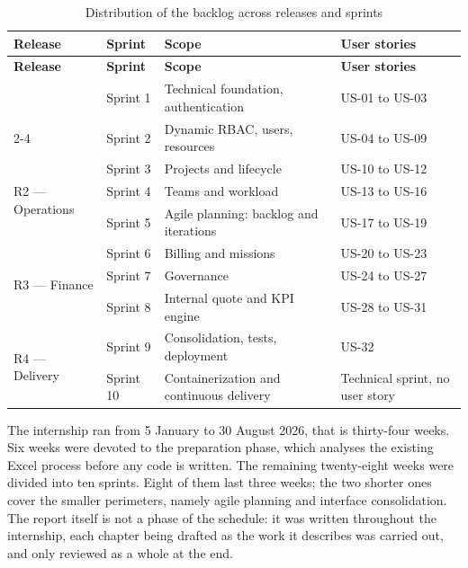 \begin{longtable}{|m{3.2cm}|m{2.0cm}|m{4.2cm}|m{4.6cm}|}
\caption{Distribution of the backlog across releases and sprints}\label{tab:planning}\\
\hline
\textbf{Release} & \textbf{Sprint} & \textbf{Scope} & \textbf{User stories} \\
\hline
\endfirsthead
\hline
\textbf{Release} & \textbf{Sprint} & \textbf{Scope} & \textbf{User stories} \\
\hline
\endhead
\endfoot
\endlastfoot
\hline
\multirow{2}{*}{R1 --- Foundation} & Sprint 1 & Technical foundation, authentication & US-01 to US-03 \\
\cline{2-4}
 & Sprint 2 & Dynamic RBAC, users, resources & US-04 to US-09 \\
\hline
\multirow{3}{*}{R2 --- Operations} & Sprint 3 & Projects and lifecycle & US-10 to US-12 \\
\cline{2-4}
 & Sprint 4 & Teams and workload & US-13 to US-16 \\
\cline{2-4}
 & Sprint 5 & Agile planning: backlog and iterations & US-17 to US-19 \\
\hline
\multirow{3}{*}{R3 --- Finance} & Sprint 6 & Billing and missions & US-20 to US-23 \\
\cline{2-4}
 & Sprint 7 & Governance & US-24 to US-27 \\
\cline{2-4}
 & Sprint 8 & Internal quote and KPI engine & US-28 to US-31 \\
\hline
\multirow{2}{*}{R4 --- Delivery} & Sprint 9 & Consolidation, tests, deployment & US-32 \\
\cline{2-4}
 & Sprint 10 & Containerization and continuous delivery & Technical sprint, no user story \\
\hline
\end{longtable}

The internship ran from 5 January to 30 August 2026, that is thirty-four weeks. Six weeks were
devoted to the preparation phase, which analyses the existing Excel process before any code is
written. The remaining twenty-eight weeks were divided into ten sprints. Eight of them last three
weeks; the two shorter ones cover the smaller perimeters, namely agile planning and interface
consolidation. The report itself is not a phase of the schedule: it was written throughout the
internship, each chapter being drafted as the work it describes was carried out, and only reviewed
as a whole at the end.


